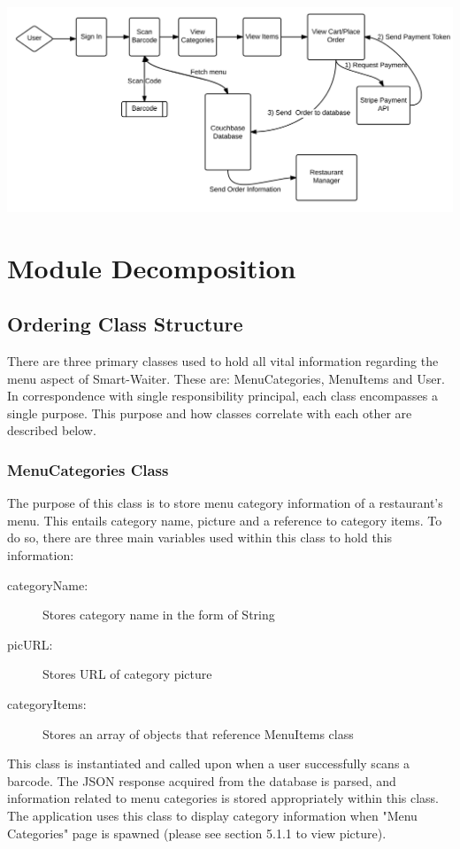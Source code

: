 \documentclass[12pt, titlepage]{article}
\begin{document}
\includegraphics[width=150mm,scale=0.5]{OverallOperation.png}

\section{Module Decomposition}


\subsection{Ordering Class Structure}
There are three primary classes used to hold all vital information regarding the menu aspect of Smart-Waiter. These are: MenuCategories, MenuItems and User. In correspondence with single responsibility principal, each class encompasses a single purpose. This purpose and how classes correlate with each other are described below. 

\subsubsection{MenuCategories Class}
The purpose of this class is to store menu category information of a restaurant's menu. This entails category name, picture and a reference to category items. To do so, there are three main variables used within this class to hold this information: 

\begin{description}
  \item[categoryName:] Stores category name in the form of String
  \item[picURL:] Stores URL of category picture
  \item[categoryItems:] Stores an array of objects that reference MenuItems class
\end{description}


This class is instantiated and called upon when a user successfully scans a barcode. The JSON response acquired from the database is parsed, and information related to menu categories is stored appropriately within this class. The application uses this class to display category information when "Menu Categories" page is spawned (please see section 5.1.1 to view picture).
\end{document}
